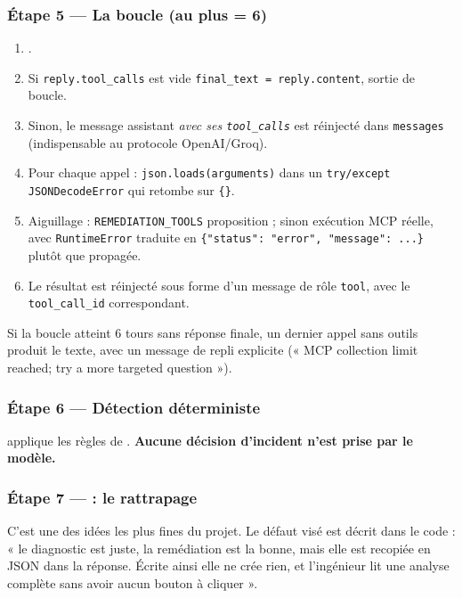 \subsubsection*{Étape 5 --- La boucle (au plus  = 6)}

\begin{enumerate}
  \item {}.
  \item Si \texttt{reply.tool\_calls} est vide \arrowto{} \texttt{final\_text =
  reply.content}, sortie de boucle.
  \item Sinon, le message assistant \emph{avec ses \texttt{tool\_calls}} est
  réinjecté dans \texttt{messages} (indispensable au protocole OpenAI/Groq).
  \item Pour chaque appel : \texttt{json.loads(arguments)} dans un
  \texttt{try/except JSONDecodeError} qui retombe sur \texttt{\{\}}.
  \item Aiguillage : \texttt{REMEDIATION\_TOOLS} \arrowto{} proposition ;
  sinon \arrowto{} exécution MCP réelle, avec \texttt{RuntimeError} traduite en
  \texttt{\{"status": "error", "message": ...\}} plutôt que propagée.
  \item Le résultat est réinjecté sous forme d'un message de rôle
  \texttt{tool}, avec le \texttt{tool\_call\_id} correspondant.
\end{enumerate}

\noindent
Si la boucle atteint 6 tours sans réponse finale, un dernier appel sans outils
produit le texte, avec un message de repli explicite (« MCP collection limit
reached; try a more targeted question »).

\subsubsection*{Étape 6 --- Détection déterministe}
 applique les règles de
. \textbf{Aucune décision d'incident n'est prise par le
modèle.}

\subsubsection*{Étape 7 ---  : le rattrapage}

C'est une des idées les plus fines du projet. Le défaut visé est décrit dans le
code : « le diagnostic est juste, la remédiation est la bonne, mais elle est
recopiée en JSON dans la réponse. Écrite ainsi elle ne crée rien, et l'ingénieur
lit une analyse complète sans avoir aucun bouton à cliquer ».

